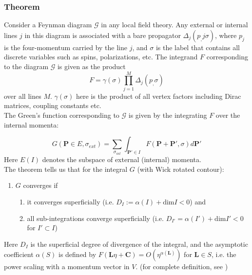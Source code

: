\documentclass{article}
\begin{document}
\subsubsection{Theorem}
Consider a Feynman diagram $\mathcal{G}$ in any local field theory. Any external or internal lines $j$ in this diagram is associated with a bare propagator $\Delta_j(p_,j\sigma)$, where $p_j$ is the four-momentum carried by the line $j$, and $\sigma$ is the label that contains all discrete variables such as spins, polarizations, etc. The integrand $F$ corresponding to the diagram $\mathcal{G}$  is given as the product
\begin{equation}
    F= \gamma(\sigma)\prod_{j=1}^M \Delta_j(p_,\sigma)
\end{equation}
over all lines $M$. $\gamma(\sigma)$ here is the product of all vertex factors including Dirac matrices, coupling constants etc. \\

The Green's function corresponding to $\mathcal{G}$ is given by the integrating $F$ over the internal momenta:

\begin{equation}
    G(\mathbf{P}\in E, \sigma_{ext}) = \sum_{\sigma_{int}}\int_{\mathbf{P'}\in I}F(\mathbf{P+P'},\sigma) d\mathbf{P'}
\end{equation}
Here $E(I)$ denotes the subspace of external (internal) momenta.\\

The theorem tells us that for the integral $G$ (with Wick rotated contour):
\begin{enumerate}
    \item $G$ converges if 
    \begin{enumerate}
        \item it converges superficially (i.e. $D_I:=\alpha(I)+\text{dim}I<0$) and 
        \item all sub-integrations converge superficially (i.e. $D_{I'}=\alpha(I')+\text{dim}I'<0$ for $I'\subset I$)
    \end{enumerate}
\end{enumerate}
Here $D_I$ is the superficial degree of divergence of the integral, and the asymptotic coefficient $\alpha(S)$ is defined by $F(\mathbf{L}\eta+\mathbf{C}) = O(\eta^{\alpha(\mathbf{L})})$ for $\mathbf{L}\in S$, i.e. the power scaling with a momentum vector in $V$. (for complete definition, see \cite[\S III]{weinberg})
\end{document}
